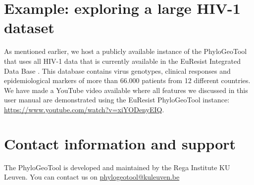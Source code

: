 \documentclass[a4paper, 11pt]{article} %
\begin{document}
\section{Example: exploring a large HIV-1 dataset}

As mentioned earlier, we host a publicly available instance of the PhyloGeoTool that uses all HIV-1 data that is currently available in the EuResist Integrated Data Base \cite{Zazzi2012}. 
This database contains virus genotypes, clinical responses and epidemiological markers of more than 66.000 patients from 12 different countries.
We have made a YouTube video available where all features we discussed in this user manual are demonstrated using the EuResist PhyloGeoTool instance: \url{https://www.youtube.com/watch?v=xiYODenyEIQ}.




\section{Contact information and support }

The PhyloGeoTool is developed and maintained by the Rega Institute KU Leuven.
You can contact us on \href{mailto:phylogeotool@kuleuven.be}{phylogeotool@kuleuven.be}





\end{document}
